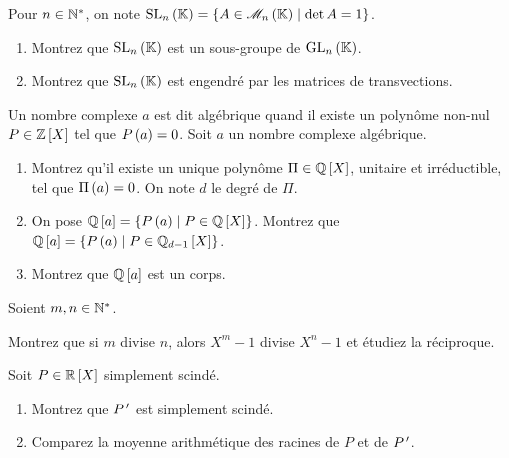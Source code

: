 \begin{exosss}
Pour \(n\in\mathbb{N}^*\), on note \(\SL{n}=\accol{A\in\M{n}\tq\det A=1}\).

\begin{enumerate}
    \item Montrez que \(\SL{n}\) est un sous-groupe de \(\GL{n}\). \\
    \item Montrez que \(\SL{n}\) est engendré par les matrices de transvections.
\end{enumerate}
\end{exosss}

\begin{exo}
Un nombre complexe \(a\) est dit algébrique quand il existe un polynôme non-nul \(P\in\poly[\Z]\) tel que \(P\left(a\right)=0\). Soit \(a\) un nombre complexe algébrique.

\begin{enumerate}
    \item Montrez qu'il existe un unique polynôme \(\Pi\in\poly[\Q]\), unitaire et irréductible, tel que \(\Pi\left(a\right)=0\). On note \(d\) le degré de \(\Pi\). \\
    \item On pose \(\poly[\Q][a]=\accol{P\paren{a}\tq P\in\poly[\Q]}\). Montrez que \(\poly[\Q][a]=\accol{P\paren{a}\tq P\in\polydeg[\Q]{d-1}}\). \\
    \item Montrez que \(\poly[\Q][a]\) est un corps.
\end{enumerate}
\end{exo}

\begin{exo}
Soient \(m,n\in\mathbb{N}^*\).

Montrez que si \(m\) divise \(n\), alors \(X^m-1\) divise \(X^n-1\) et étudiez la réciproque.
\end{exo}

\begin{exo}
Soit \(P\in\poly[\R]\) simplement scindé.

\begin{enumerate}
    \item Montrez que \(P^{\,\prime}\) est simplement scindé. \\
    \item Comparez la moyenne arithmétique des racines de \(P\) et de \(P^{\,\prime}\).
\end{enumerate}
\end{exo}

